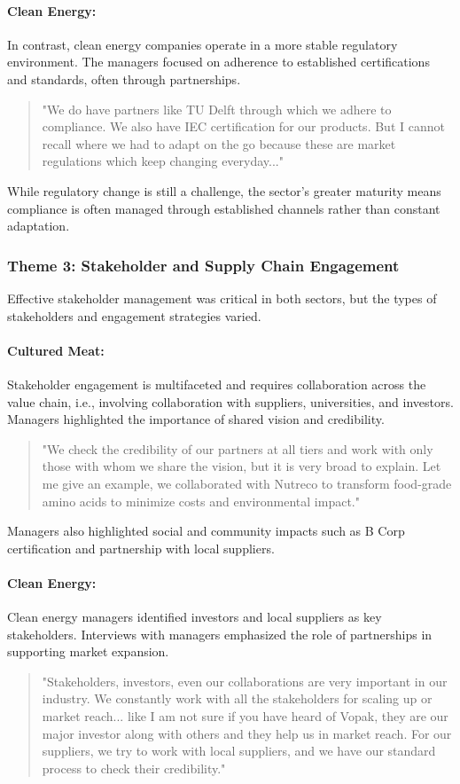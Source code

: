 \paragraph{Clean Energy:} In contrast, clean energy companies operate in a more stable regulatory environment. The managers focused on adherence to established certifications and standards, often through partnerships.
\begin{quote}
	"We do have partners like TU Delft through which we adhere to compliance. We also have IEC certification for our products. But I cannot recall where we had to adapt on the go because these are market regulations which keep changing everyday..."
\end{quote}
While regulatory change is still a challenge, the sector's greater maturity means compliance is often managed through established channels rather than constant adaptation.

\subsubsection{Theme 3: Stakeholder and Supply Chain Engagement}
Effective stakeholder management was critical in both sectors, but the types of stakeholders and engagement strategies varied.

\paragraph{Cultured Meat:} Stakeholder engagement is multifaceted and requires collaboration across the value chain, i.e., involving collaboration with suppliers, universities, and investors. Managers highlighted the importance of shared vision and credibility.
\begin{quote}
	"We check the credibility of our partners at all tiers and work with only those with whom we share the vision, but it is very broad to explain. Let me give an example, we collaborated with Nutreco to transform food-grade amino acids to minimize costs and environmental impact."
\end{quote}
Managers also highlighted social and community impacts such as B Corp certification and partnership with local suppliers.

\paragraph{Clean Energy:} Clean energy managers identified investors and local suppliers as key stakeholders. Interviews with managers emphasized the role of partnerships in supporting market expansion.
\begin{quote}
	"Stakeholders, investors, even our collaborations are very important in our industry. We constantly work with all the stakeholders for scaling up or market reach... like I am not sure if you have heard of Vopak, they are our major investor along with others and they help us in market reach. For our suppliers, we try to work with local suppliers, and we have our standard process to check their credibility."
\end{quote}

